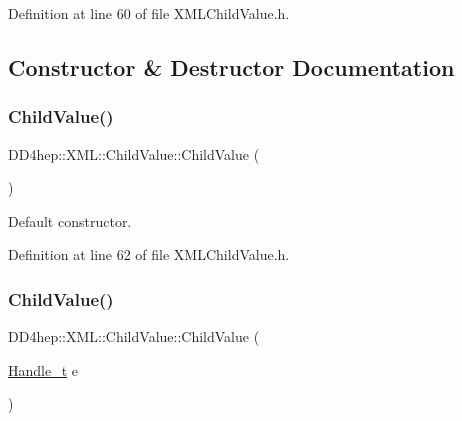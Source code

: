 Definition at line 60 of file X\+M\+L\+Child\+Value.\+h.



\subsection{Constructor \& Destructor Documentation}
\hypertarget{struct_d_d4hep_1_1_x_m_l_1_1_child_value_aa23bcc094d5069317c5e0dba4e0007ce}{}\label{struct_d_d4hep_1_1_x_m_l_1_1_child_value_aa23bcc094d5069317c5e0dba4e0007ce} 
\subsubsection{\texorpdfstring{Child\+Value()}{ChildValue()}\hspace{0.1cm}{\footnotesize\ttfamily [1/3]}}
{\footnotesize\ttfamily D\+D4hep\+::\+X\+M\+L\+::\+Child\+Value\+::\+Child\+Value (\begin{DoxyParamCaption}{ }\end{DoxyParamCaption})\hspace{0.3cm}{\ttfamily [inline]}}



Default constructor. 



Definition at line 62 of file X\+M\+L\+Child\+Value.\+h.

\hypertarget{struct_d_d4hep_1_1_x_m_l_1_1_child_value_af223fea6d4d6b08ac0cb655f22e8e2b0}{}\label{struct_d_d4hep_1_1_x_m_l_1_1_child_value_af223fea6d4d6b08ac0cb655f22e8e2b0} 
\subsubsection{\texorpdfstring{Child\+Value()}{ChildValue()}\hspace{0.1cm}{\footnotesize\ttfamily [2/3]}}
{\footnotesize\ttfamily D\+D4hep\+::\+X\+M\+L\+::\+Child\+Value\+::\+Child\+Value (\begin{DoxyParamCaption}\item[{\hyperlink{class_d_d4hep_1_1_x_m_l_1_1_handle__t}{Handle\+\_\+t}}]{e }\end{DoxyParamCaption})\hspace{0.3cm}{\ttfamily [inline]}}



